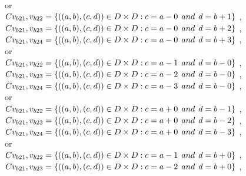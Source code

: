\\or
\\$C{v_{b21},v_{b22}}=\{((a,b),(c,d))\in D\times D: c = a - 0\hspace{1ex} and \hspace{1ex}  d = b + 1 \}$ , 
\\$C{v_{b21},v_{b23}}=\{((a,b),(c,d))\in D\times D: c = a - 0\hspace{1ex} and \hspace{1ex}  d = b + 2 \}$ , 
\\$C{v_{b21},v_{b24}}=\{((a,b),(c,d))\in D\times D: c = a - 0\hspace{1ex} and \hspace{1ex}  d = b + 3 \}$ , 
\\or
\\$C{v_{b21},v_{b22}}=\{((a,b),(c,d))\in D\times D: c = a - 1\hspace{1ex} and \hspace{1ex}  d = b - 0 \}$ , 
\\$C{v_{b21},v_{b23}}=\{((a,b),(c,d))\in D\times D: c = a - 2\hspace{1ex} and \hspace{1ex}  d = b - 0 \}$ , 
\\$C{v_{b21},v_{b24}}=\{((a,b),(c,d))\in D\times D: c = a - 3\hspace{1ex} and \hspace{1ex}  d = b - 0 \}$ , 
\\or
\\$C{v_{b21},v_{b22}}=\{((a,b),(c,d))\in D\times D: c = a + 0\hspace{1ex} and \hspace{1ex}  d = b - 1 \}$ , 
\\$C{v_{b21},v_{b23}}=\{((a,b),(c,d))\in D\times D: c = a + 0\hspace{1ex} and \hspace{1ex}  d = b - 2 \}$ , 
\\$C{v_{b21},v_{b24}}=\{((a,b),(c,d))\in D\times D: c = a + 0\hspace{1ex} and \hspace{1ex}  d = b - 3 \}$ , 
\\or
\\$C{v_{b21},v_{b22}}=\{((a,b),(c,d))\in D\times D: c = a - 1\hspace{1ex} and \hspace{1ex}  d = b + 0 \}$ , 
\\$C{v_{b21},v_{b23}}=\{((a,b),(c,d))\in D\times D: c = a - 2\hspace{1ex} and \hspace{1ex}  d = b + 0 \}$ , 
